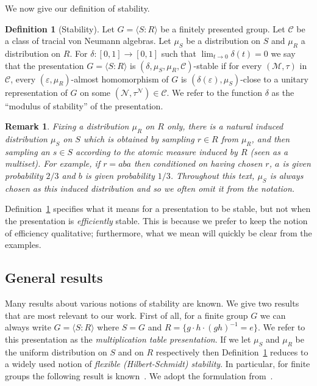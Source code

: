\documentclass[11pt]{article}
\newtheorem{remark}[theorem]{Remark}
\theoremstyle{definition}
\newtheorem{definition}[theorem]{Definition}
\newcommand{\mC}{\ensuremath{\mathcal{C}}}
\newcommand{\cM}{\ensuremath{\mathcal{M}}}
\newcommand{\eps}{\varepsilon}
\newcommand{\mN}{\mathcal{N}}
\begin{document}
We now give our definition of stability.

\begin{definition}[Stability]\label{def:eff-stab}
Let $G = \langle S:R\rangle $ be a finitely presented group. Let $\mC$ be a class of tracial von Neumann algebras. Let $\mu_S$ be a distribution on $S$ and $\mu_R$ a distribution on $R$. For $\delta:[0,1]\to[0,1]$ such that $\lim_{t\to 0}\delta(t)=0$ we say that the presentation $G=\langle S:R\rangle$ is $(\delta,\mu_S,\mu_R,\mC)$-stable if for every $(\cM,\tau)$ in $\mC$, every $(\eps,\mu_R)$-almost homomorphism of $G$ is $(\delta(\eps),\mu_S)$-close to a unitary representation of $G$ on some $(\mN,\tau^\mN)\in \mC$. We refer to the function $\delta$ as the ``modulus of stability'' of the presentation.
\end{definition}

\begin{remark}\label{rk-mus}
Fixing a distribution $\mu_R$ on $R$ only, there is a natural induced distribution $\mu_S$ on $S$ which is obtained by sampling $r\in R$ from $\mu_R$, and then sampling an $s\in S$ according to the atomic measure induced by $R$ (seen as a multiset). For example, if $r=aba$ then conditioned on having chosen $r$, $a$ is given probability $2/3$ and $b$ is given probability $1/3$. Throughout this text, $\mu_S$ is always chosen as this induced distribution and so we often omit it from the notation. 
\end{remark}

Definition~\ref{def:eff-stab} specifies what it means for a presentation to be stable, but not when the presentation is \emph{efficiently} stable. This is because we prefer to keep the notion of efficiency qualitative; furthermore, what we mean will quickly be clear from the examples. 


\subsection{General results}

Many results about various notions of stability are known.  We give two results that are most relevant to our work. First of all, 
for a finite group $G$ we can always write $G=\langle S:R\rangle$ where $S = G$ and $R=\{ g\cdot h \cdot (gh)^{-1} =e \}$. We refer to this presentation as the \emph{multiplication table presentation}. If we let $\mu_S$ and $\mu_R$ be the uniform distribution on $S$ and on $R$ respectively then Definition~\ref{def:eff-stab} reduces to a widely used notion of \emph{flexible (Hilbert-Schmidt) stability}. In particular, for finite groups the following result is known~\cite{gowers2017inverse,de2019operator}. We adopt the formulation from~\cite[Theorem 1.4]{de2022spectral}.
\end{document}
